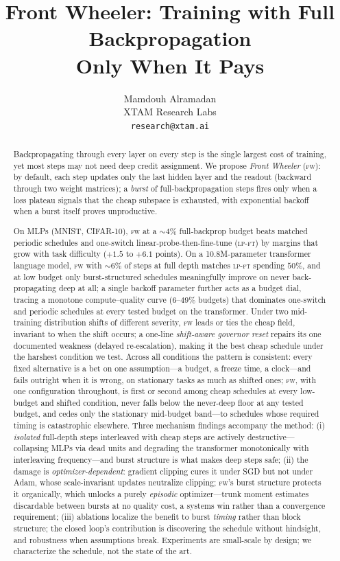 \documentclass[11pt]{article}
\title{Front Wheeler: Training with Full Backpropagation\\
Only When It Pays}
\author{Mamdouh Alramadan\\
XTAM Research Labs\\
\texttt{research@xtam.ai}}
\date{}
\newcommand{\fw}{\textsc{fw}}
\newcommand{\lpft}{\textsc{lp-ft}}
\begin{document}
\maketitle

\begin{abstract}
Backpropagating through every layer on every step is the single largest cost
of training, yet most steps may not need deep credit assignment. We propose
\emph{Front Wheeler} (\fw{}): by default, each step updates only the last
hidden layer and the readout (backward through two weight matrices); a
\emph{burst} of full-backpropagation steps fires only when a loss plateau
signals that the cheap subspace is exhausted, with exponential backoff when a
burst itself proves unproductive.

On MLPs (MNIST, CIFAR-10), \fw{} at a
${\sim}4\%$ full-backprop budget beats matched periodic schedules and
one-switch linear-probe-then-fine-tune (\lpft{}) by margins that grow with
task difficulty ($+1.5$ to $+6.1$ points). On a 10.8M-parameter transformer
language model, \fw{} with ${\sim}6\%$ of steps at full depth matches
\lpft{} spending $50\%$, and at low budget only burst-structured schedules meaningfully improve on
never back-propagating deep at all; a single backoff parameter further
acts as a budget dial, tracing a monotone compute--quality curve
($6$--$49\%$ budgets) that dominates one-switch and periodic schedules at
every tested budget on the transformer. Under two mid-training distribution shifts of different severity, \fw{}
leads or ties the cheap field, invariant to when the shift occurs; a one-line
\emph{shift-aware governor reset} repairs its one documented weakness
(delayed re-escalation), making it the best cheap schedule under the
harshest condition we test. Across all conditions the pattern is consistent:
every fixed alternative is a bet on one assumption---a budget, a freeze
time, a clock---and fails outright when it is wrong, on stationary tasks as
much as shifted ones; \fw{}, with one configuration throughout, is first or second among
cheap schedules at every low-budget and shifted condition, never falls
below the never-deep floor at any tested budget, and cedes only the
stationary mid-budget band---to schedules whose required timing is
catastrophic elsewhere. Three mechanism findings accompany the
method: (i) \emph{isolated} full-depth steps interleaved with cheap steps
are actively destructive---collapsing MLPs via dead units and degrading the
transformer monotonically with interleaving frequency---and burst structure
is what makes deep steps safe; (ii) the damage is \emph{optimizer-dependent}: gradient clipping cures
it under SGD but not under Adam, whose scale-invariant updates neutralize
clipping; \fw{}'s burst structure protects it organically, which unlocks a
purely \emph{episodic} optimizer---trunk moment estimates discardable
between bursts at no quality cost, a systems win rather than a convergence
requirement; (iii) ablations localize the benefit to burst \emph{timing} rather than
block structure; the closed loop's contribution is discovering the schedule
without hindsight, and robustness when assumptions break.
Experiments are small-scale by design; we characterize the schedule, not the
state of the art.
\end{abstract}
\end{document}
